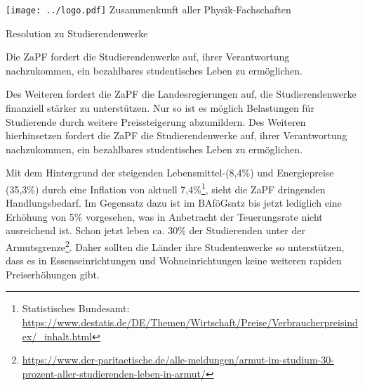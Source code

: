 \documentclass[DIV=calc]{scrartcl}
\begin{document}
\hspace{0.87\textwidth}
\begin{minipage}{120pt}
	\vspace{-1.8cm}
	\texttt{[image: ../logo.pdf]}
	\centering
	\small Zusammenkunft aller Physik-Fachschaften
\end{minipage}

\begin{center}
  \huge{Resolution zu Studierendenwerke}\vspace{.25\baselineskip}\\
  \normalsize
\end{center}
\vspace{1cm}






Die ZaPF fordert die Studierendenwerke auf, ihrer Verantwortung nachzukommen, ein bezahlbares studentisches Leben zu ermöglichen.

Des Weiteren fordert die ZaPF die Landesregierungen auf, die Studierendenwerke finanziell stärker zu unterstützen.
Nur so ist es möglich Belastungen für Studierende durch weitere Preissteigerung abzumildern.
Des Weiteren hierhinsetzen fordert die ZaPF die Studierendenwerke auf, ihrer Verantwortung nachzukommen, ein bezahlbares studentisches Leben zu ermöglichen.

Mit dem Hintergrund der steigenden Lebensmittel-(8,4\%) und Energiepreise (35,3\%) durch eine Inflation von aktuell 7,4\%\footnote{Statistisches Bundesamt:
\url{https://www.destatis.de/DE/Themen/Wirtschaft/Preise/Verbraucherpreisindex/_inhalt.html}}, sieht die ZaPF dringenden Handlungsbedarf. Im Gegensatz dazu ist im BAföGsatz bis jetzt lediglich eine Erhöhung von 5\% vorgesehen, was in Anbetracht der Teuerungsrate nicht ausreichend ist. Schon jetzt leben ca. 30\% der Studierenden unter der Armutsgrenze\footnote{\url{https://www.der-paritaetische.de/alle-meldungen/armut-im-studium-30-prozent-aller-studierenden-leben-in-armut/}}. Daher sollten die Länder ihre Studentenwerke so unterstützen, dass es in Essenseinrichtungen und Wohneinrichtungen keine weiteren rapiden Preiserhöhungen gibt.
\end{document}
